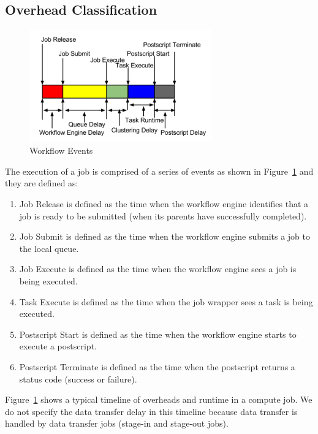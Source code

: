 \subsection{Overhead Classification}


\begin{figure}[h!]
	\centering
    \includegraphics[width=0.7\textwidth]{figures/model/overhead.pdf}
    \caption{Workflow Events}
    \label{fig:model_overhead}
\end{figure}


The execution of a job is comprised of a series of events as shown in Figure~\ref{fig:model_overhead} and they are defined as:
\begin{enumerate}
\item Job Release is defined as the time when the workflow engine identifies that a job is ready to be submitted (when its parents have successfully completed). 
\item Job Submit is defined as the time when the workflow engine submits a job to the local queue. 
\item Job Execute is defined as the time when the workflow engine sees a job is being executed. 
\item Task Execute is defined as the time when the job wrapper sees a task is being executed. 

\item Postscript Start is defined as the time when the workflow engine starts to execute a postscript. 
\item Postscript Terminate is defined as the time when the postscript returns a status code (success or failure). 
\end{enumerate}

Figure~\ref{fig:model_overhead} shows a typical timeline of overheads and runtime in a compute job. We do not specify the data transfer delay in this timeline because data transfer is handled by data transfer jobs (stage-in and stage-out jobs). 

